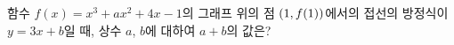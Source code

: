 함수 $f(x)=x^3+ax^2+4x-1$의 그래프 위의 점 $(1{,}\mkern3mu\mathopen{}f(1))$에서의 접선의 방정식이 $y=3x+b$일 때, 상수 $a$, $b$에 대하여 $a+b$의 값은?
